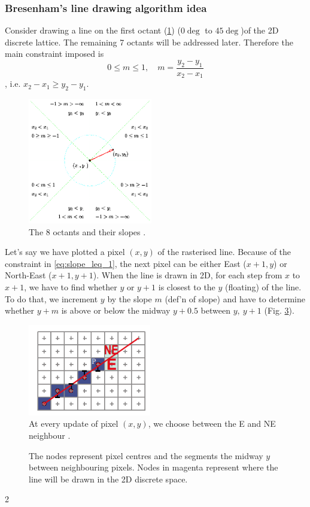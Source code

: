 \documentclass[a4paper]{article}
\begin{document}
\subsubsection{Bresenham's line drawing algorithm idea}
Consider drawing a line on the first octant (\ref{fig:octants}) ($0\deg$ to $45\deg$)of the 2D discrete lattice. The remaining 7 octants will be addressed later. Therefore the main constraint imposed is
\begin{equation}
	0 \leq m \leq 1,\quad m = \frac{y_2-y_1}{x_2-x_1} 
	\label{eq:slope_leq_1}
\end{equation}
, i.e. $x_2 - x_1 \geq y_2 - y_1$.
\begin{figure}[H]
	\centering
	\includegraphics[height=5.5cm]{img/octants.png}
	\caption{The 8 octants and their slopes \cite{mallinus}.}
	\label{fig:octants}
\end{figure}

Let's say we have plotted a pixel $(x,y)$ of the rasterised line. Because of the constraint in \eqref{eq:slope_leq_1}, the next pixel can be either East ($x+1,y$) or North-East ($x+1,y+1$). When the line is drawn in 2D, for each step from $x$ to $x+1$, we have to find whether $y$ or $y+1$ is closest to the $y$ (floating) of the line. To do that, we increment $y$ by the slope $m$ (def'n of slope) and have to determine whether $y+m$ is above or below the midway $y+0.5$  between $y, \ y+1$ (Fig. \ref{fig:grid_line_1st_octant}).

\begin{multicols}{2}
	\begin{figure}[H]
		\centering
		\includegraphics[height=4cm]{img/next_pixel_n_ne.png}
		\caption{At every update of pixel $(x,y)$, we choose between the E and NE neighbour \cite{mdamian}.}
		\label{fig:}
	\end{figure}
\columnbreak
	\begin{figure}[H]
	\centering
	
	\caption{The nodes represent pixel centres and the segments the midway $y$ between neighbouring pixels. Nodes in magenta represent where the line will be drawn in the 2D discrete space.}
	\label{fig:grid_line_1st_octant}
\end{figure}


\end{multicols}{2}
\end{document}
